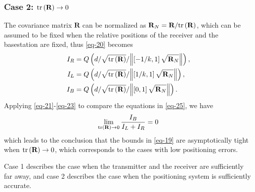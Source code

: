 \documentclass{IEEEtran}
\begin{document}
\subsubsection{Case 2: ${{\rm{tr}}\left( {\textbf{\bf{R}}} \right)} \to 0$}
The covariance matrix $\textbf{R}$ can be normalized as ${{\textbf{R}}_N} = {{\textbf{R}}}/{{{\rm{tr}}\left( {\textbf{R}} \right)}}$, which can be assumed to be fixed when the relative positions of the receiver and the basestation are fixed, thus \eqref{eq-20} becomes
\begin{equation}\label{eq-25}
\begin{split}
{I_R} &= Q\left( {{{d/\sqrt {{\rm{tr}}\left( {\textbf{R}} \right)} }}/{{\left\| {\left[ { - 1/k,1} \right]\sqrt {{{\textbf{R}}_N}} } \right\|}}} \right),\\
{I_L} &= Q\left( {{{d/\sqrt {{\rm{tr}}\left( {\textbf{R}} \right)} }}/{{\left\| {\left[ {1/k,1} \right]\sqrt {{{\textbf{R}}_N}} } \right\|}}} \right),\\
{I_B} &= Q\left( {{{d/\sqrt {{\rm{tr}}\left( {\textbf{R}} \right)} }}/{{\left\| {\left[ {0,1} \right]\sqrt {{{\textbf{R}}_N}} } \right\|}}} \right).
\end{split}
\end{equation}
Applying \eqref{eq-21}-\eqref{eq-23} to compare the equations in \eqref{eq-25}, we have
\begin{equation}\label{eq-26}
  \mathop {\lim }\limits_{{\rm{tr}}\left( {\textbf{R}} \right) \to 0 } \frac{{{I_B}}}{{{I_L} + {I_R}}} = 0
\end{equation}
which leads to the conclusion that the bounds in \eqref{eq-19} are asymptotically tight when ${\rm{tr}}\left( {\textbf{R}} \right) \to 0 $, which corresponds to the cases with low positioning errors.

Case 1 describes the case when the transmitter and the receiver are sufficiently far away, and case 2 describes the case when the positioning system is sufficiently accurate.
\end{document}
